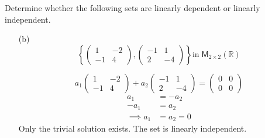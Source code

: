 Determine whether the following sets are linearly dependent or
linearly independent.
\begin{enumerate}
\item[(b)] 
\[
\left\{\begin{pmatrix}
1 & -2\\
-1 & 4
\end{pmatrix}
,
\begin{pmatrix}
-1 & 1\\
2 & -4
\end{pmatrix}\right\} 
\text{in}\;\mathsf{M}_{2\times2}(\mathbb{R})\]

\begin{equation}
a_1\begin{pmatrix}
1 & -2\\
-1 & 4
\end{pmatrix} +a_2
\begin{pmatrix}
-1 & 1\\
2 & -4
\end{pmatrix} =
\begin{pmatrix}
0 & 0\\
0 & 0
\end{pmatrix}
\end{equation}
\begin{align}
a_1 &= -a_2\\
-a_1 &= a_2\\
\implies a_1 &= a_2 = 0
\end{align}
Only the trivial solution exists. The set is linearly independent.



\end{enumerate}
